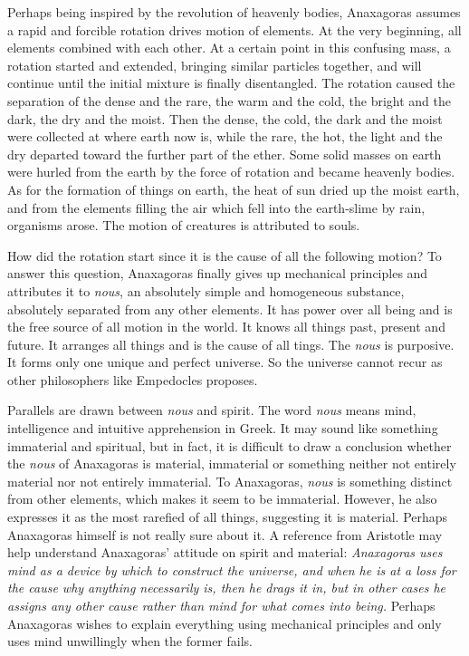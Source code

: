 \documentclass[11pt]{article}
\begin{document}
\begin{sloppypar}
\par

Perhaps being inspired by the revolution of heavenly bodies, Anaxagoras assumes a rapid and forcible rotation drives motion of elements. 
At the very beginning, all elements combined with each other. 
At a certain point in this confusing mass, a rotation started and extended, bringing similar particles together, and will continue until the initial mixture is finally disentangled. 
The rotation caused the separation of the dense and the rare, the warm and the cold, the bright and the dark, the dry and the moist. 
Then the dense, the cold, the dark and the moist were collected at where earth now is, while the rare, the hot, the light and the dry departed toward the further part of the ether. 
Some solid masses on earth were hurled from the earth by the force of rotation and became heavenly bodies. 
As for the formation of things on earth, the heat of sun dried up the moist earth, and from the elements filling the air which fell into the earth-slime by rain, organisms arose. 
The motion of creatures is attributed to souls.

\par

How did the rotation start since it is the cause of all the following motion? 
To answer this question, Anaxagoras finally gives up mechanical principles and attributes it to \textit{nous}, an absolutely simple and homogeneous substance, absolutely separated from any other elements. 
It has power over all being and is the free source of all motion in the world. 
It knows all things past, present and future. 
It arranges all things and is the cause of all tings. 
The \textit{nous} is purposive. 
It forms only one unique and perfect universe. 
So the universe cannot recur as other philosophers like Empedocles proposes. 

\par

Parallels are drawn between \textit{nous} and spirit. 
The word \textit{nous} means mind, intelligence and intuitive apprehension in Greek. 
It may sound like something immaterial and spiritual, but in fact, it is difficult to draw a conclusion whether the \textit{nous} of Anaxagoras is material, immaterial or something neither not entirely material nor not entirely immaterial. 
To Anaxagoras, \textit{nous} is something distinct from other elements, which makes it seem to be immaterial. 
However, he also expresses it as the most rarefied of all things, suggesting it is material. 
Perhaps Anaxagoras himself is not really sure about it. 
A reference from Aristotle may help understand Anaxagoras’ attitude on spirit and material: 
\newline  
\textit{Anaxagoras uses mind as a device by which to construct the universe, and when he is at a loss for the cause why anything necessarily is, then he drags it in, but in other cases he assigns any other cause rather than mind for what comes into being.}
\newline
Perhaps Anaxagoras wishes to explain everything using mechanical principles and only uses mind unwillingly when the former fails. 
\end{sloppypar}
\end{document}
